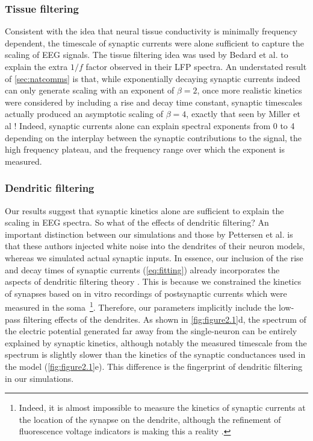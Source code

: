 \subsubsection{Tissue filtering}
Consistent with the idea that neural tissue conductivity is minimally frequency dependent, the timescale of synaptic currents were alone sufficient to capture the scaling of EEG signals. The tissue filtering idea was used by Bedard et al. \cite{Bedard2006a} to explain the extra $1/f$ factor observed in their LFP spectra. An understated result of \autoref{sec:natcomms} is that, while exponentially decaying synaptic currents indeed can only generate scaling with an exponent of $\beta=2$, once more realistic kinetics were considered by including a rise and decay time constant, synaptic timescales actually produced an asymptotic scaling of $\beta=4$, exactly that seen by Miller et al \cite{Miller2009}! Indeed, synaptic currents alone can explain spectral exponents from 0 to 4 depending on the interplay between the synaptic contributions to the signal, the high frequency plateau, and the frequency range over which the exponent is measured.

\subsubsection{Dendritic filtering}
Our results suggest that synaptic kinetics alone are sufficient to explain the scaling in EEG spectra. So what of the effects of dendritic filtering? An important distinction between our simulations and those by Pettersen et al. \cite{Pettersen2014} is that these authors injected white noise into the dendrites of their neuron models, whereas we simulated actual synaptic inputs. In essence, our inclusion of the rise and decay times of synaptic currents (\ref{eq:fitting}) already incorporates the aspects of dendritic filtering theory \cite{Linden2010, Pettersen2008, Pettersen2014}. This is because we constrained the kinetics of synapses based on in vitro recordings of postsynaptic currents which were measured in the soma~\footnote[2]{Indeed, it is almost impossible to measure the kinetics of synaptic currents at the location of the synapse on the dendrite, although the refinement of fluorescence voltage indicators is making this a reality \cite{Knopfel2019}.}. Therefore, our parameters implicitly include the low-pass filtering effects of the dendrites. As shown in \autoref{fig:figure2.1}d, the spectrum of the electric potential generated far away from the single-neuron can be entirely explained by synaptic kinetics, although notably the measured timescale from the spectrum is slightly slower than the kinetics of the synaptic conductances used in the model (\autoref{fig:figure2.1}e). This difference is the fingerprint of dendritic filtering in our simulations. 

